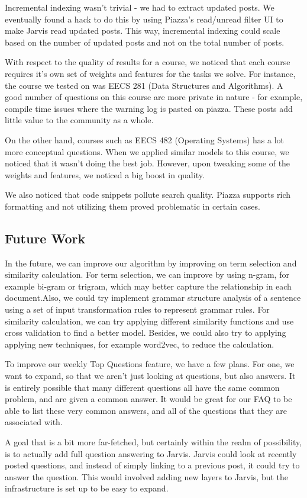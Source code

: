 \documentclass[sigconf]{acmart}
\begin{document}
Incremental indexing wasn't trivial - we had to extract updated posts. We eventually found a hack to do this by using Piazza's read/unread filter UI to make Jarvis read updated posts. This way, incremental indexing could scale based on the number of updated posts and not on the total number of posts.

With respect to the quality of results for a course, we noticed that each course requires it's own set of weights and features for the tasks we solve. For instance, the course we tested on was EECS 281 (Data Structures and Algorithms). A good number of questions on this course are more private in nature - for example, compile time issues where the warning log is pasted on piazza. These posts add little value to the community as a whole.

On the other hand, courses such as EECS 482 (Operating Systems) has a lot more conceptual questions. When we applied similar models to this course, we noticed that it wasn't doing the best job. However, upon tweaking some of the weights and features, we noticed a big boost in quality.

We also noticed that code snippets pollute search quality. Piazza supports rich formatting and not utilizing them proved problematic in certain cases.


\subsection{Future Work}
In the future, we can improve our algorithm by improving on term selection and similarity calculation. For term selection, we can improve by using n-gram, for example bi-gram or trigram, which may better capture the relationship in each document.Also, we could try implement  grammar structure analysis of a sentence using a set of input transformation rules to represent grammar rules. For similarity calculation, we can try applying different similarity functions and use cross validation to find a better model. Besides, we could also try to applying applying new techniques, for example word2vec, to reduce the calculation.

To improve our weekly Top Questions feature, we have a few plans. For one, we want to expand, so that we aren't just looking at questions, but also answers. It is entirely possible that many different questions all have the same common problem, and are given a common answer. It would be great for our FAQ to be able to list these very common answers, and all of the questions that they are associated with.

A goal that is a bit more far-fetched, but certainly within the realm of possibility, is to actually add full question answering to Jarvis. Jarvis could look at recently posted questions, and instead of simply linking to a previous post, it could try to answer the question. This would involved adding new layers to Jarvis, but the infrastructure is set up to be easy to expand.



 
\end{document}
